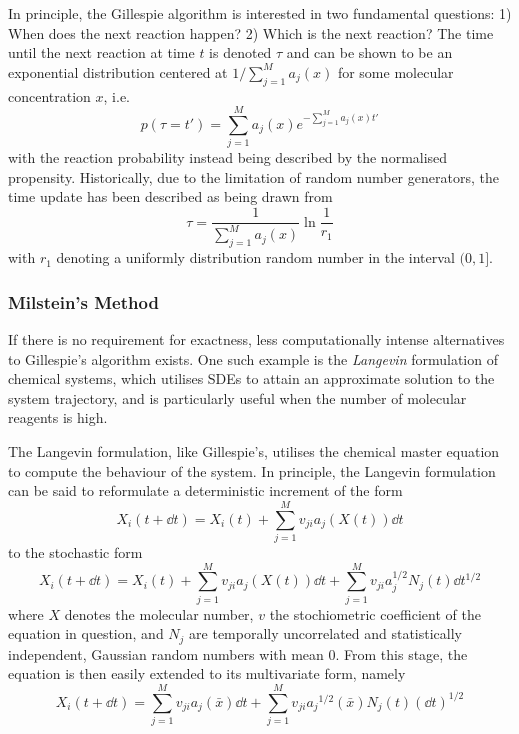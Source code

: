 In principle, the Gillespie algorithm is interested in two fundamental
questions: 1) When does the next reaction happen? 2) Which is the next reaction?
The time until the next reaction at time $t$ is denoted $\tau$ and can be shown
to be an exponential distribution centered  
at $1 / \sum_{j=1}^{M}a_j(x)$ for some molecular concentration $x$, i.e.
\begin{equation}
  p(\tau = t') = \sum_{j=1}^M a_j(x)e^{-\sum_{j=1}^M a_j(x)t'}
  \label{eq:gill:time}
\end{equation}
with the reaction probability instead being described by the normalised
propensity. Historically, due to the limitation of random number generators, the
time update has been described as being drawn from 
\begin{equation} 
  \displaystyle
  \tau = \dfrac{1}{\sum_{j=1}^M a_j(x)} \ln\dfrac{1}{r_1}
  \label{eq:gill_time_update}
\end{equation}
with $r_1$ denoting a uniformly distribution random number in the interval
$(0,1]$.

\subsubsection{Milstein's Method}
\label{sec:milstein}
If there is no requirement for exactness, less computationally intense
alternatives to Gillespie's algorithm exists. One such example is the
\textit{Langevin} formulation of chemical systems, which utilises SDEs to
attain an approximate solution to the system trajectory, and is particularly
useful when the number of molecular reagents is high. 

The Langevin formulation, like Gillespie's, utilises the chemical master
equation to compute the behaviour of the system. In principle, the Langevin
formulation can be said to reformulate a deterministic increment of the form
\begin{equation}
  X_i(t + \dd{t}) = X_{i}(t) + \sum_{j=1}^M
  v_{ji}a_j(X(t))\dd{t}
  \label{eq:deterministic}
\end{equation}
to the stochastic form
\begin{equation}
  X_i(t + \dd{t}) = X_{i}(t) + \sum_{j=1}^M
  v_{ji}a_j(X(t))\dd{t} + \sum_{j=1}^M
  v_{ji}a_j^{1/2}N_j(t)\dd{t}^{1/2}
  \label{eq:stoch}
\end{equation}
where $X$ denotes the molecular number, $v$ the stochiometric coefficient of the
equation in question, and $N_j$ are temporally uncorrelated and statistically
independent, Gaussian random numbers with mean 0. From this stage, the equation
is then easily extended to its multivariate form, namely
\begin{equation}
  X_i(t + \dd{t}) = \sum_{j=1}^Mv_{ji}a_j(\bar x) \dd{t} +
  \sum_{j=1}^M v_{ji}{a_j}^{1/2}(\bar x) N_j(t) \left( \dd t \right)^{1/2}
  \label{eq:stoch_multi}
\end{equation}

